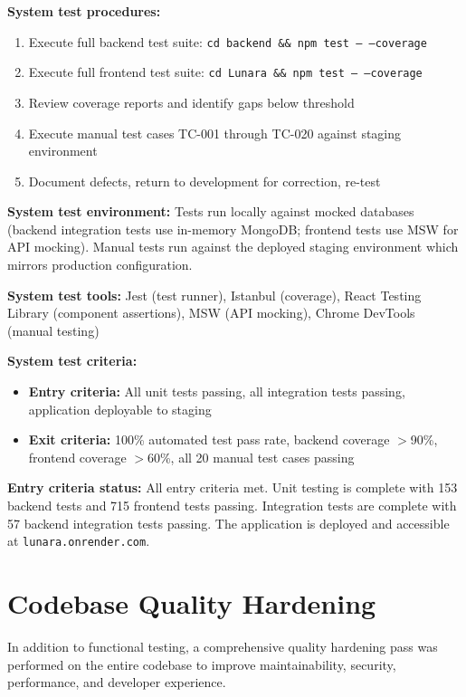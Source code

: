 \documentclass[12pt,letterpaper]{article}
\begin{document}
\textbf{System test procedures:}
\begin{enumerate}
  \item Execute full backend test suite: \texttt{cd backend \&\& npm test -- --coverage}
  \item Execute full frontend test suite: \texttt{cd Lunara \&\& npm test -- --coverage}
  \item Review coverage reports and identify gaps below threshold
  \item Execute manual test cases TC-001 through TC-020 against staging environment
  \item Document defects, return to development for correction, re-test
\end{enumerate}

\textbf{System test environment:} Tests run locally against mocked databases (backend integration tests use in-memory MongoDB; frontend tests use MSW for API mocking). Manual tests run against the deployed staging environment which mirrors production configuration.

\textbf{System test tools:} Jest (test runner), Istanbul (coverage), React Testing Library (component assertions), MSW (API mocking), Chrome DevTools (manual testing)

\textbf{System test criteria:}
\begin{itemize}[nosep]
  \item \textbf{Entry criteria:} All unit tests passing, all integration tests passing, application deployable to staging
  \item \textbf{Exit criteria:} 100\% automated test pass rate, backend coverage $>$90\%, frontend coverage $>$60\%, all 20 manual test cases passing
\end{itemize}

\textbf{Entry criteria status:} All entry criteria met. Unit testing is complete with 153 backend tests and 715 frontend tests passing. Integration tests are complete with 57 backend integration tests passing. The application is deployed and accessible at \texttt{lunara.onrender.com}.

\section{Codebase Quality Hardening}

In addition to functional testing, a comprehensive quality hardening pass was performed on the entire codebase to improve maintainability, security, performance, and developer experience.
\end{document}
